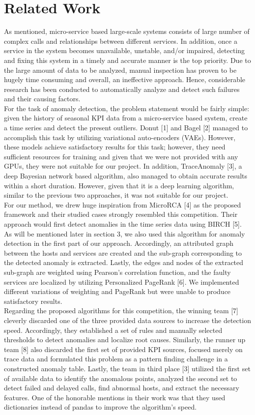 \documentclass[12pt]{article}
\begin{document}
\section{Related Work}
As mentioned, micro-service based large-scale systems consists of large number of complex calls and relationships between different services. In addition, once a service in the system becomes unavailable, unstable, and/or impaired, detecting and fixing this system in a timely and accurate manner is the top priority. Due to the large amount of data to be analyzed, manual inspection has proven to be hugely time consuming and overall, an ineffective approach. Hence, considerable research has been conducted to automatically analyze and detect such failures and their causing factors.\\
For the task of anomaly detection, the problem statement would be fairly simple: given the history of seasonal KPI data from a micro-service based system, create a time series and detect the present outliers. Donut [1] and Bagel [2] managed to accomplish this task by utilizing variational auto-encoders (VAEs). However, these models achieve satisfactory results for this task; however, they need sufficient resources for training and given that we were not provided with any GPUs, they were not suitable for our project. In addition, TraceAnomaly [3], a deep Bayesian network based algorithm, also managed to obtain accurate results within a short duration. However, given that it is a deep learning algorithm, similar to the previous two approaches, it was not suitable for our project. \\
For our method, we drew huge inspiration from MicroRCA [4] as the proposed framework and their studied cases strongly resembled this competition. Their approach would first detect anomalies in the time series data using BIRCH [5]. As will be mentioned later in section 3, we also used this algorithm for anomaly detection in the first part of our approach. Accordingly, an attributed graph between the hosts and services are created and the sub-graph corresponding to the detected anomaly is extracted. Lastly, the edges and nodes of the extracted sub-graph are weighted using Pearson's correlation function, and the faulty services are localized by utilizing Personalized PageRank [6]. We implemented different variations of weighting and PageRank but were unable to produce satisfactory results. \\
Regarding the proposed algorithms for this competition, the winning team [7] cleverly discarded one of the three provided data sources to increase the detection speed. Accordingly, they established a set of rules and manually selected thresholds to detect anomalies and localize root causes. Similarly, the runner up team [8] also discarded the first set of provided KPI sources, focused merely on trace data and formulated this problem as a pattern finding challenge in a constructed anomaly table. Lastly, the team in third place [3] utilized the first set of available data to identify the anomalous points, analyzed the second set to detect failed and delayed calls, find abnormal hosts, and extract the necessary features. One of the honorable mentions in their work was that they used dictionaries instead of pandas to improve the algorithm's speed. 
\end{document}
